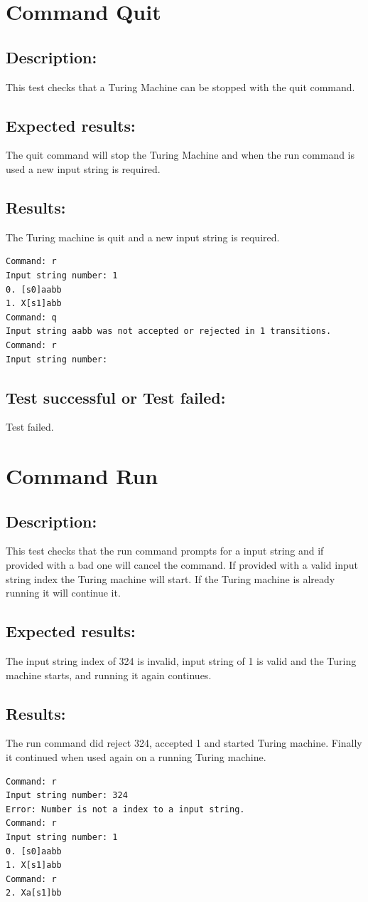 \documentclass{report}
\begin{document}
\chapter{Command Quit}
\section{Description:} This test checks that a Turing Machine can be stopped with the quit command.
\section{Expected results:} The quit command will stop the Turing Machine and when the run command is used a new input string is required.

\section{Results:} The Turing machine is quit and a new input string is required.
\begin{verbatim}
Command: r
Input string number: 1
0. [s0]aabb
1. X[s1]abb
Command: q
Input string aabb was not accepted or rejected in 1 transitions.
Command: r
Input string number:
\end{verbatim}
\section{Test successful or Test failed:} Test failed.
\pagebreak



\chapter{Command Run}
\section{Description:} This test checks that the run command prompts for a input string and if provided with a bad one will cancel the command. If provided with a valid input string index the Turing machine will start. If the Turing machine is already running it will continue it.
\section{Expected results:} The input string index of 324 is invalid, input string of 1 is valid and the Turing machine starts, and running it again continues.
\section{Results:} The run command did reject 324, accepted 1 and started Turing machine. Finally it continued when used again on a running Turing machine.
\begin{verbatim}
Command: r
Input string number: 324
Error: Number is not a index to a input string.
Command: r
Input string number: 1
0. [s0]aabb
1. X[s1]abb
Command: r
2. Xa[s1]bb
\end{verbatim}
\end{document}

